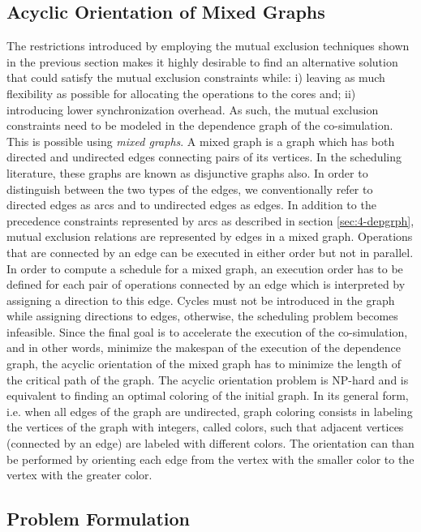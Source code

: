 \subsection{Acyclic Orientation of Mixed Graphs}

The restrictions introduced by employing the mutual exclusion techniques shown in the previous section makes it highly desirable to find an alternative solution that could satisfy the mutual exclusion constraints while: i) leaving as much flexibility as possible for allocating the operations to the cores and; ii) introducing lower synchronization overhead. As such, the mutual exclusion constraints need to be modeled in the dependence graph of the co-simulation. This is possible using \textit{mixed graphs}. A mixed graph is a graph which has both directed and undirected edges connecting pairs of its vertices. In the scheduling literature, these graphs are known as disjunctive graphs also. In order to distinguish between the two types of the edges, we conventionally refer to directed edges as arcs and to undirected edges as edges. In addition to the precedence constraints represented by arcs as described in section \ref{sec:4-depgrph}, mutual exclusion relations are represented by edges in a mixed graph. Operations that are connected by an edge can be executed in either order but not in parallel. In order to compute a schedule for a mixed graph, an execution order has to be defined for each pair of operations connected by an edge which is interpreted by assigning a direction to this edge. Cycles must not be introduced in the graph while assigning directions to edges, otherwise, the scheduling problem becomes infeasible. Since the final goal is to accelerate the execution of the co-simulation, and in other words, minimize the makespan of the execution of the dependence graph, the acyclic orientation of the mixed graph has to minimize the length of the critical path of the graph. 
The acyclic orientation problem is NP-hard and is equivalent to finding an optimal coloring of the initial graph. In its general form, i.e. when all edges of the graph are undirected, graph coloring consists in labeling the vertices of the graph with integers, called colors, such that adjacent vertices (connected by an edge) are labeled with different colors. The orientation can than be performed by orienting each edge from the vertex with the smaller color to the vertex with the greater color.
 
\subsection{Problem Formulation}


